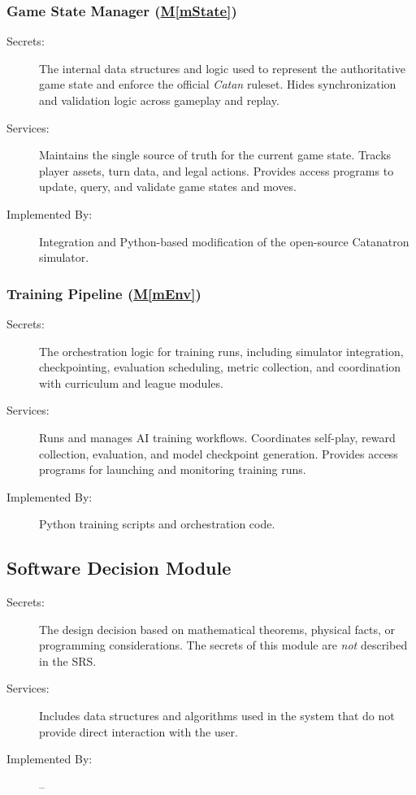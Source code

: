 \documentclass[12pt, titlepage]{article}
\newcommand{\mref}[1]{\hyperref[sec:#1]{M\ref*{#1}}}
\begin{document}
\subsubsection{Game State Manager (\mref{mState})} \label{sec:mState}
\begin{description}
\item[Secrets:] The internal data structures and logic used to represent the authoritative game state and enforce the official \emph{Catan} ruleset.
Hides synchronization and validation logic across gameplay and replay.
\item[Services:] Maintains the single source of truth for the current game state.
Tracks player assets, turn data, and legal actions.
Provides access programs to update, query, and validate game states and moves.
\item[Implemented By:] Integration and Python-based modification of the open-source Catanatron simulator.
\end{description}

\subsubsection{Training Pipeline (\mref{mEnv})} \label{sec:mEnv}
\begin{description}
\item[Secrets:] The orchestration logic for training runs, including simulator integration, checkpointing, evaluation scheduling, metric collection, and coordination with curriculum and league modules.
\item[Services:] Runs and manages AI training workflows.
Coordinates self-play, reward collection, evaluation, and model checkpoint generation.
Provides access programs for launching and monitoring training runs.
\item[Implemented By:] Python training scripts and orchestration code.
\end{description}

\subsection{Software Decision Module}
\begin{description}
\item[Secrets:] The design decision based on mathematical theorems, physical
facts, or programming considerations.
The secrets of this module are
\emph{not} described in the SRS.
\item[Services:] Includes data structures and algorithms used in the system that
do not provide direct interaction with the user.
\item[Implemented By:] --
\end{description}
\end{document}
